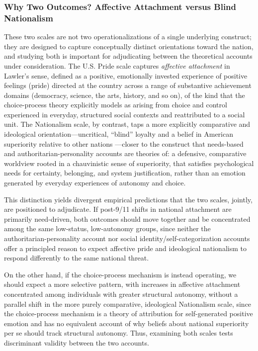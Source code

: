 \documentclass[12pt,letterpaper]{article}
\begin{document}
\subsubsection{Why Two Outcomes? Affective Attachment versus Blind Nationalism}
These two scales are not two operationalizations of a single underlying construct; they are designed to capture conceptually distinct orientations toward the nation, and studying both is important for adjudicating between the theoretical accounts under consideration. The U.S. Pride scale captures \textit{affective attachment} in Lawler's sense, defined as a positive, emotionally invested experience of positive feelings (pride) directed at the country across a range of substantive achievement domains (democracy, science, the arts, history, and so on), of the kind that the choice-process theory explicitly models as arising from choice and control experienced in everyday, structured social contexts and reattributed to a social unit. The Nationalism scale, by contrast, taps a more explicitly comparative and ideological orientation---uncritical, ``blind'' loyalty and a belief in American superiority relative to other nations \citep{schatz1999varieties}---closer to the construct that needs-based and authoritarian-personality accounts are theories of: a defensive, comparative worldview rooted in a chauvinistic sense of superiority, that satisfies psychological needs for certainty, belonging, and system justification, rather than an emotion generated by everyday experiences of autonomy and choice.

This distinction yields divergent empirical predictions that the two scales, jointly, are positioned to adjudicate. If post-9/11 shifts in national attachment are primarily need-driven, both outcomes should move together and be concentrated among the same low-status, low-autonomy groups, since neither the authoritarian-personality account nor social identity/self-categorization accounts offer a principled reason to expect affective pride and ideological nationalism to respond differently to the same national threat. 

On the other hand, if the choice-process mechanism is instead operating, we should expect a more selective pattern, with increases in affective attachment concentrated among individuals with greater structural autonomy, without a parallel shift in the more purely comparative, ideological Nationalism scale, since the choice-process mechanism is a theory of attribution for self-generated positive emotion and has no equivalent account of why beliefs about national superiority per se should track structural autonomy. Thus, examining both scales tests discriminant validity between the two accounts. 
\end{document}
